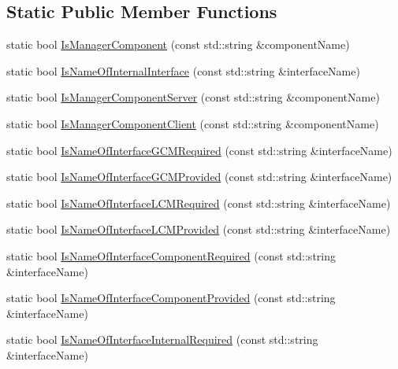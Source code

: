 \subsection*{Static Public Member Functions}
\begin{DoxyCompactItemize}
\item 
static bool \hyperlink{classmts_manager_component_base_a2b81d05712eee16325eb12b92caefef7}{Is\+Manager\+Component} (const std\+::string \&component\+Name)
\item 
static bool \hyperlink{classmts_manager_component_base_ac51eb56e9120d968f1b3df87df1a2298}{Is\+Name\+Of\+Internal\+Interface} (const std\+::string \&interface\+Name)
\item 
static bool \hyperlink{classmts_manager_component_base_afa7148c79d92b99d7144a07c3a1e88ec}{Is\+Manager\+Component\+Server} (const std\+::string \&component\+Name)
\item 
static bool \hyperlink{classmts_manager_component_base_aac57d1d2f4ec563af9c8aaf99bc41b9f}{Is\+Manager\+Component\+Client} (const std\+::string \&component\+Name)
\item 
static bool \hyperlink{classmts_manager_component_base_ae09aa81c2df6d77b4c8ad648d6c9511e}{Is\+Name\+Of\+Interface\+G\+C\+M\+Required} (const std\+::string \&interface\+Name)
\item 
static bool \hyperlink{classmts_manager_component_base_a0430ee1fecc934e7471f30a05fd155d2}{Is\+Name\+Of\+Interface\+G\+C\+M\+Provided} (const std\+::string \&interface\+Name)
\item 
static bool \hyperlink{classmts_manager_component_base_aa6932925d53be7d712e6e8b3bea648bd}{Is\+Name\+Of\+Interface\+L\+C\+M\+Required} (const std\+::string \&interface\+Name)
\item 
static bool \hyperlink{classmts_manager_component_base_a2ab19337dd1251b4d85e50533f5712b7}{Is\+Name\+Of\+Interface\+L\+C\+M\+Provided} (const std\+::string \&interface\+Name)
\item 
static bool \hyperlink{classmts_manager_component_base_a0c23070ddde13927e97af42194248285}{Is\+Name\+Of\+Interface\+Component\+Required} (const std\+::string \&interface\+Name)
\item 
static bool \hyperlink{classmts_manager_component_base_ab927635380aff3ba6bbc2f9ac0232862}{Is\+Name\+Of\+Interface\+Component\+Provided} (const std\+::string \&interface\+Name)
\item 
static bool \hyperlink{classmts_manager_component_base_a264b0eaa7cba44ec821bc909df58b8ba}{Is\+Name\+Of\+Interface\+Internal\+Required} (const std\+::string \&interface\+Name)

\end{DoxyCompactItemize}

